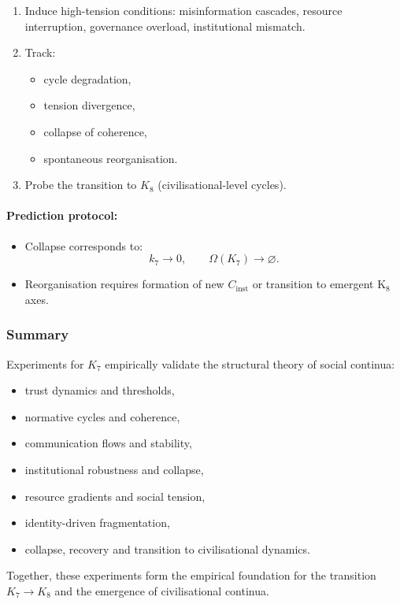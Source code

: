 \begin{enumerate}
    \item Induce high-tension conditions:
          misinformation cascades, resource interruption,
          governance overload, institutional mismatch.
    \item Track:
          \begin{itemize}
              \item cycle degradation,
              \item tension divergence,
              \item collapse of coherence,
              \item spontaneous reorganisation.
          \end{itemize}
    \item Probe the transition to $K_8$ (civilisational-level cycles).
\end{enumerate}

\paragraph{Prediction protocol:}

\begin{itemize}
    \item Collapse corresponds to:
          \[
             k_7 \rightarrow 0,\qquad
             \Omega(K_7) \rightarrow \varnothing.
          \]
    \item Reorganisation requires formation of new $C_{\mathrm{inst}}$
          or transition to emergent K$_8$ axes.
\end{itemize}



\subsubsection{Summary}

Experiments for $K_7$ empirically validate the structural theory of
social continua:

\begin{itemize}
    \item trust dynamics and thresholds,
    \item normative cycles and coherence,
    \item communication flows and stability,
    \item institutional robustness and collapse,
    \item resource gradients and social tension,
    \item identity-driven fragmentation,
    \item collapse, recovery and transition to civilisational dynamics.
\end{itemize}

Together, these experiments form the empirical foundation for the
transition $K_7 \rightarrow K_8$ and the emergence of civilisational
continua.
